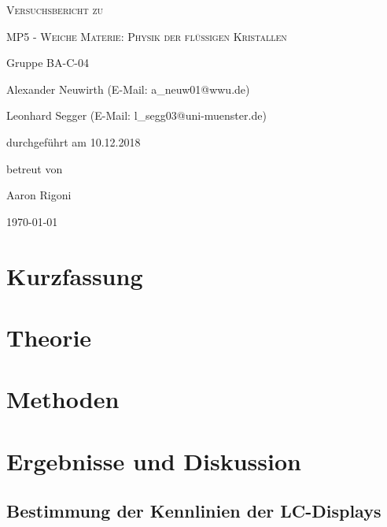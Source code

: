 \documentclass[
	a4paper,
	12pt,
	pagesize,
	ngerman
]{scrartcl}
\begin{document}
	\begin{titlepage}
		\centering
		{\scshape\LARGE Versuchsbericht zu \par}
		\vspace{1cm}
		{\scshape\huge MP5 - Weiche Materie: Physik der
flüssigen Kristallen \par}
		\vspace{2.5cm}
		{\LARGE Gruppe BA-C-04 \par}
		\vspace{0.5cm}

		{\large Alexander Neuwirth (E-Mail: a\_neuw01@wwu.de) \par}
		{\large Leonhard Segger (E-Mail: l\_segg03@uni-muenster.de) \par}
		\vfill

		durchgeführt am 10.12.2018\par
		betreut von\par
		{\large Aaron Rigoni}

		\vfill

		{\large \today\par}
	\end{titlepage}
	\tableofcontents
	\newpage


	\section{Kurzfassung}

	\section{Theorie}
	\section{Methoden}

	\section{Ergebnisse und Diskussion}
	\subsection{Bestimmung der Kennlinien der LC-Displays}
\end{document}
